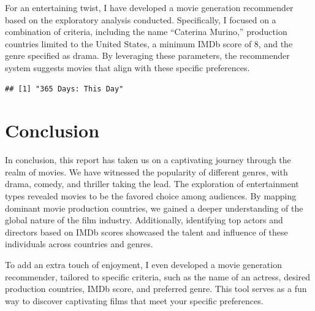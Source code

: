 \documentclass[11pt,preprint, authoryear]{elsarticle}
\numberwithin{equation}{section}
\numberwithin{figure}{section}
\numberwithin{table}{section}
\begin{document}
For an entertaining twist, I have developed a movie generation
recommender based on the exploratory analysis conducted. Specifically, I
focused on a combination of criteria, including the name ``Caterina
Murino,'' production countries limited to the United States, a minimum
IMDb score of 8, and the genre specified as drama. By leveraging these
parameters, the recommender system suggests movies that align with these
specific preferences.

\begin{verbatim}
## [1] "365 Days: This Day"
\end{verbatim}

\hfill

\hypertarget{conclusion}{%
\section{Conclusion}\label{conclusion}}

In conclusion, this report has taken us on a captivating journey through
the realm of movies. We have witnessed the popularity of different
genres, with drama, comedy, and thriller taking the lead. The
exploration of entertainment types revealed movies to be the favored
choice among audiences. By mapping dominant movie production countries,
we gained a deeper understanding of the global nature of the film
industry. Additionally, identifying top actors and directors based on
IMDb scores showcased the talent and influence of these individuals
across countries and genres.

To add an extra touch of enjoyment, I even developed a movie generation
recommender, tailored to specific criteria, such as the name of an
actress, desired production countries, IMDb score, and preferred genre.
This tool serves as a fun way to discover captivating films that meet
your specific preferences.


\end{document}

